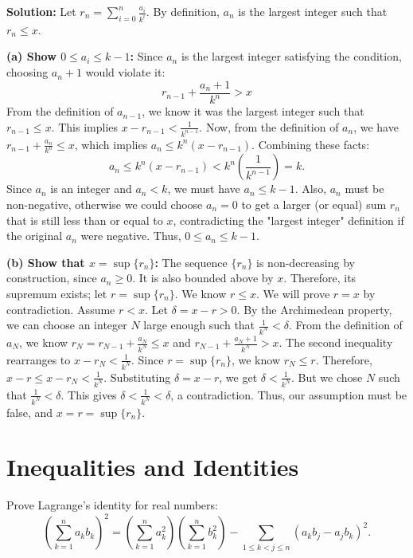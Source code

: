\textbf{Solution:}
Let \( r_n = \sum_{i=0}^n \frac{a_i}{k^i} \). By definition, \( a_n \) is the largest integer such that \( r_n \leq x \).

\textbf{(a) Show \( 0 \leq a_i \leq k - 1 \):}
Since \( a_n \) is the largest integer satisfying the condition, choosing \( a_n + 1 \) would violate it:
\[
r_{n-1} + \frac{a_n + 1}{k^n} > x
\]
From the definition of \(a_{n-1}\), we know it was the largest integer such that \( r_{n-1} \le x \). This implies $x - r_{n-1} < \frac{1}{k^{n-1}}$.
Now, from the definition of $a_n$, we have $r_{n-1} + \frac{a_n}{k^n} \leq x$, which implies $a_n \leq k^n(x - r_{n-1})$.
Combining these facts:
\[
a_n \leq k^n(x - r_{n-1}) < k^n\left(\frac{1}{k^{n-1}}\right) = k.
\]
Since $a_n$ is an integer and $a_n < k$, we must have $a_n \leq k-1$. Also, $a_n$ must be non-negative, otherwise we could choose $a_n=0$ to get a larger (or equal) sum $r_n$ that is still less than or equal to $x$, contradicting the "largest integer" definition if the original $a_n$ were negative. Thus, $0 \leq a_n \leq k-1$.

\textbf{(b) Show that \( x = \sup \{ r_n \} \):}
The sequence $\{r_n\}$ is non-decreasing by construction, since $a_n \ge 0$. It is also bounded above by $x$. Therefore, its supremum exists; let $r = \sup\{r_n\}$. We know $r \le x$.
We will prove $r=x$ by contradiction. Assume $r < x$. Let $\delta = x - r > 0$.
By the Archimedean property, we can choose an integer $N$ large enough such that $\frac{1}{k^N} < \delta$.
From the definition of $a_N$, we know $r_N = r_{N-1} + \frac{a_N}{k^N} \le x$ and $r_{N-1} + \frac{a_N+1}{k^N} > x$.
The second inequality rearranges to $x - r_N < \frac{1}{k^N}$.
Since $r = \sup\{r_n\}$, we know $r_N \leq r$.
Therefore, $x - r \leq x - r_N < \frac{1}{k^N}$.
Substituting $\delta = x-r$, we get $\delta < \frac{1}{k^N}$.
But we chose $N$ such that $\frac{1}{k^N} < \delta$. This gives $\delta < \frac{1}{k^N} < \delta$, a contradiction.
Thus, our assumption must be false, and $x = r = \sup\{r_n\}$.

\section{Inequalities and Identities}
\begin{problembox}
Prove Lagrange’s identity for real numbers:
\[
\left( \sum_{k=1}^n a_k b_k \right)^2 = \left( \sum_{k=1}^n a_k^2 \right)\left( \sum_{k=1}^n b_k^2 \right) - \sum_{1 \leq k < j \leq n} (a_k b_j - a_j b_k)^2.
\]
\end{problembox}

